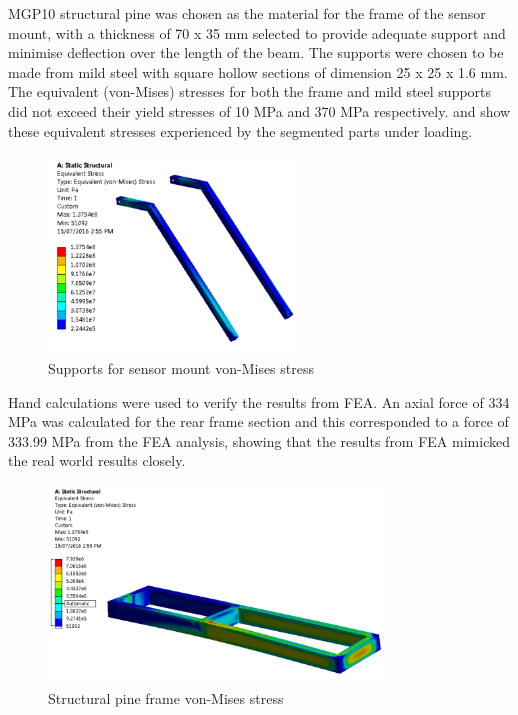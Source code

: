 \documentclass[main.tex]{subfiles}
\begin{document}
MGP10 structural pine was chosen as the material for the frame of the sensor mount, with a thickness of 70 x 35 mm selected to provide adequate support and minimise deflection over the length of the beam. The supports were chosen to be made from mild steel with square hollow sections of dimension 25 x 25 x 1.6 mm. The equivalent (von-Mises) stresses for both the frame and mild steel supports did not exceed their yield stresses of 10 MPa and 370 MPa respectively.  and  show these equivalent stresses experienced by the segmented parts under loading.
%
\begin{figure}[ht]
\includegraphics[width=0.6\textwidth]{4-DetailedDesign/topFrame.PNG}
\centering
\caption{Supports for sensor mount von-Mises stress} 
\end{figure}

Hand calculations were used to verify the results from FEA. An axial force of 334 MPa was calculated for the rear frame section and this corresponded to a force of 333.99 MPa from the FEA analysis, showing that the results from FEA mimicked the real world results closely. 
\begin{figure}[!ht]
\includegraphics[width=0.8\textwidth]{4-DetailedDesign/bottomFrame.PNG}
\centering
\caption{Structural pine frame von-Mises stress} 
\end{figure}
\end{document}
